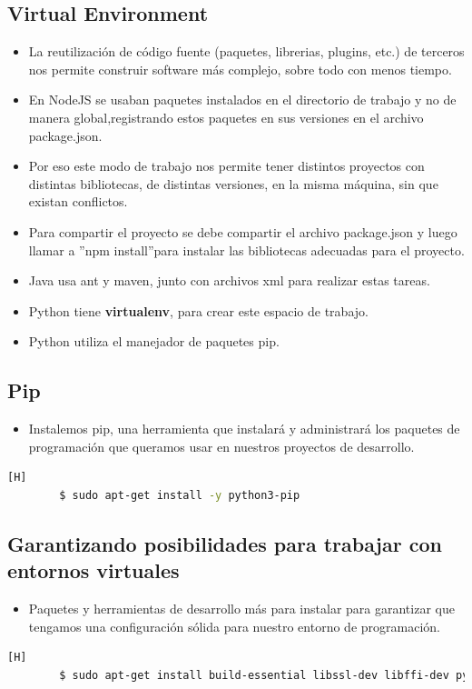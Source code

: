 \documentclass{article}
\begin{document}
	\subsection{Virtual Environment}
	\begin{itemize}
		\item La reutilización de código fuente (paquetes, librerias, plugins, etc.) de terceros nos permite construir software más complejo, sobre todo con menos tiempo.
		\item En NodeJS se usaban paquetes instalados en el directorio de trabajo y no de manera global,registrando estos paquetes en sus versiones en el archivo package.json.
		\item Por eso este modo de trabajo nos permite tener distintos proyectos con distintas bibliotecas, de distintas versiones, en la misma máquina, sin que existan conflictos.
		\item Para compartir el proyecto se debe compartir el archivo package.json y luego llamar a ”npm install”para instalar las bibliotecas adecuadas para el proyecto.
		\item Java usa ant y maven, junto con archivos xml para realizar estas tareas.
		\item Python tiene \textbf{virtualenv}, para crear este espacio de trabajo.
		\item Python utiliza el manejador de paquetes pip.
	\end{itemize}
	
	\subsection{Pip}
	\begin{itemize}
		\item Instalemos pip, una herramienta que instalará y administrará los paquetes de programación que queramos usar en nuestros proyectos de desarrollo.
	\end{itemize}
	\begin{lstlisting}[language=bash,caption={Instalación de pip}][H]
		$ sudo apt-get install -y python3-pip
	\end{lstlisting}
	
	\subsection{Garantizando posibilidades para trabajar con entornos virtuales}
	\begin{itemize}
		\item Paquetes y herramientas de desarrollo más para instalar para garantizar que tengamos una configuración sólida para nuestro entorno de programación.
	\end{itemize}
	\begin{lstlisting}[language=bash,caption={Instalaciones previas para entorno virtual}][H]
		$ sudo apt-get install build-essential libssl-dev libffi-dev python3-dev
	\end{lstlisting}
	
\end{document}
